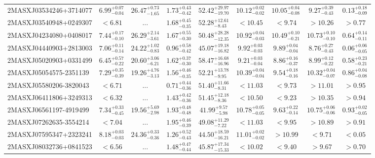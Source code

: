 \documentclass[onecolumn]{mn2e}
\begin{document}
{\begin{center}
\begin{longtable}{lcccccccc}
2MASXJ03534246+3714077 & $6.99_{-0.04}^{+0.07}$ & $26.47_{-1.65}^{+0.73}$ & $1.73_{-0.42}^{+0.43}$ &$52.42_{-19.70}^{+29.97}$ & $10.12_{-0.02}^{+0.02}$ & $10.05_{-0.08}^{+0.04}$ & $9.27_{-0.43}^{+0.39}$ & $0.13_{-0.09}^{+0.18}$ \\
2MASXJ03540948+0249307 & $<6.81$ & ... & $1.68_{-0.35}^{+0.45}$ &$52.28_{-8.43}^{+12.61}$ & $<10.45$ & $<9.74$ & $>10.26$ & $>0.77$ \\
2MASXJ04234080+0408017 & $7.44_{-0.10}^{+0.17}$ & $26.29_{-3.61}^{+2.14}$ & $1.67_{-0.30}^{+0.55}$ &$50.48_{-12.35}^{+28.28}$ & $10.92_{-0.03}^{+0.04}$ & $10.49_{-0.21}^{+0.10}$ & $10.73_{-0.10}^{+0.10}$ & $0.64_{-0.11}^{+0.14}$ \\
2MASXJ04440903+2813003 & $7.06_{-0.14}^{+0.11}$ & $24.22_{-0.83}^{+1.02}$ & $0.96_{-0.42}^{+0.58}$ &$45.07_{-16.82}^{+19.18}$ & $9.92_{-0.03}^{+0.03}$ & $9.89_{-0.04}^{+0.04}$ & $8.76_{-0.43}^{+0.27}$ & $0.06_{-0.05}^{+0.06}$ \\
2MASXJ05020903+0331499 & $6.45_{-0.22}^{+0.57}$ & $20.60_{-6.21}^{+3.06}$ & $1.62_{-0.30}^{+0.37}$ &$58.47_{-16.96}^{+16.68}$ & $9.21_{-0.04}^{+0.03}$ & $8.86_{-0.37}^{+0.16}$ & $8.99_{-0.22}^{+0.12}$ & $0.58_{-0.21}^{+0.23}$ \\
2MASXJ05054575-2351139 & $7.29_{-0.39}^{+0.35}$ & $19.26_{-3.13}^{+4.76}$ & $1.56_{-0.35}^{+0.46}$ &$52.21_{-9.95}^{+13.78}$ & $10.39_{-0.04}^{+0.04}$ & $9.54_{-0.16}^{+0.18}$ & $10.32_{-0.07}^{+0.04}$ & $0.86_{-0.08}^{+0.04}$ \\
2MASXJ05580206-3820043 & $<6.71$ & ... & $0.71_{-0.36}^{+0.44}$ &$51.40_{-8.31}^{+11.66}$ & $<11.03$ & $<9.73$ & $>11.01$ & $>0.95$ \\
2MASXJ06411806+3249313 & $<6.32$ & ... & $1.43_{-0.36}^{+0.42}$ &$51.45_{-8.36}^{+12.18}$ & $<10.50$ & $<9.23$ & $>10.35$ & $>0.94$ \\
2MASXJ06561197-4919499 & $7.34_{-0.45}^{+0.33}$ & $19.56_{-2.98}^{+5.69}$ & $1.93_{-0.48}^{+0.48}$ &$41.99_{-5.98}^{+9.57}$ & $10.78_{-0.05}^{+0.05}$ & $9.63_{-0.14}^{+0.22}$ & $10.75_{-0.06}^{+0.06}$ & $0.93_{-0.05}^{+0.02}$ \\
2MASXJ07262635-3554214 & $<7.04$ & ... & $1.95_{-0.39}^{+0.46}$ &$49.08_{-7.22}^{+11.29}$ & $<11.03$ & $<9.95$ & $>10.89$ & $>0.91$ \\
2MASXJ07595347+2323241 & $8.18_{-0.03}^{+0.03}$ & $24.36_{-0.36}^{+0.33}$ & $1.26_{-0.43}^{+0.52}$ &$44.50_{-16.21}^{+18.59}$ & $11.01_{-0.02}^{+0.02}$ & $>10.99$ & $<9.71$ & $<0.05$ \\
2MASXJ08032736+0841523 & $<6.56$ & ... & $1.48_{-0.44}^{+0.47}$ &$45.87_{-15.33}^{+17.34}$ & $<10.02$ & $<9.40$ & $>9.67$ & $>0.70$ \\

\end{longtable}
\end{center}}
\end{document}
